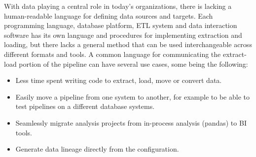 With data playing a central role in today's organizations, there is
lacking a human-readable language for defining data sources and targets.
Each programming language, database platform, ETL system and data
interaction software has its own language and procedures for
implementing extraction and loading, but there lacks a general method
that can be used interchangeable across different formats and tools. A
common language for communicating the extract-load portion of the
pipeline can have several use cases, some being the following:

\begin{itemize}
\item
  Less time spent writing code to extract, load, move or convert data.
\item
  Easily move a pipeline from one system to another, for example to be
  able to test pipelines on a different database systems.
\item
  Seamlessly migrate analysis projects from in-process analysis (pandas)
  to BI tools.
\item
  Generate data lineage directly from the configuration.
\end{itemize}
